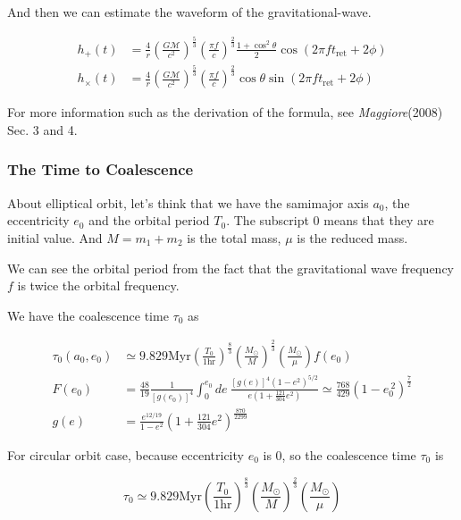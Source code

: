 And then we can estimate the waveform of the gravitational-wave.

\begin{align}
    h_+(t) &= \frac{4}{r} \left( \frac{G\mathcal{M}}{c^2} \right)^{\frac{5}{3}} \left( \frac{\pi f}{c} \right)^{\frac{2}{3}} \frac{1 + \cos^2{\theta}}{2} \cos{(2\pi f t_{\mathrm{ret}} + 2 \phi)} \\
    h_\times(t) &= \frac{4}{r} \left( \frac{G\mathcal{M}}{c^2} \right)^{\frac{5}{3}} \left( \frac{\pi f}{c} \right)^{\frac{2}{3}} \cos{\theta} \sin{(2\pi f t_{\mathrm{ret}} + 2 \phi)}
\end{align}

For more information such as the derivation of the formula, see \textit{Maggiore}(2008) Sec. 3 and 4.

\subsubsection{The Time to Coalescence}

About elliptical orbit, let's think that we have the samimajor axis $a_0$, the eccentricity $e_0$ and the orbital period $T_0$. The subscript $0$ means that they are initial value. And $M = m_1 + m_2$ is the total mass, $\mu$ is the reduced mass.

We can see the orbital period from the fact that the gravitational wave frequency $f$ is twice the orbital frequency.

We have the coalescence time $\tau_0$ as

\begin{align}
    \tau_0(a_0, e_0) &\simeq 9.829\mathrm{Myr} \left( \frac{T_0}{1\mathrm{hr}} \right)^{\frac{8}{3}} \left( \frac{M_\odot}{M} \right)^{\frac{2}{3}} \left( \frac{M_\odot}{\mu} \right) f(e_0) \\
    F(e_0) &= \frac{48}{19} \frac{1}{[g(e_0)]^4} \int_{0}^{e_0} de \ \frac{[g(e)]^4 (1 - e^2)^{5/2}}{e(1 + \frac{121}{304} e^2)} \simeq \frac{768}{429} (1 - e_0^{\ 2})^\frac{7}{2} \\
    g(e) &= \frac{e^{12/19}}{1 - e^2} \left( 1 + \frac{121}{304} e^2 \right)^\frac{870}{2299}
\end{align}

For circular orbit case, because eccentricity $e_0$ is 0, so the coalescence time $\tau_0$ is

\begin{equation}
    \tau_0 \simeq 9.829\mathrm{Myr} \left( \frac{T_0}{1\mathrm{hr}} \right)^{\frac{8}{3}} \left( \frac{M_\odot}{M} \right)^{\frac{2}{3}} \left( \frac{M_\odot}{\mu} \right)
\end{equation}

